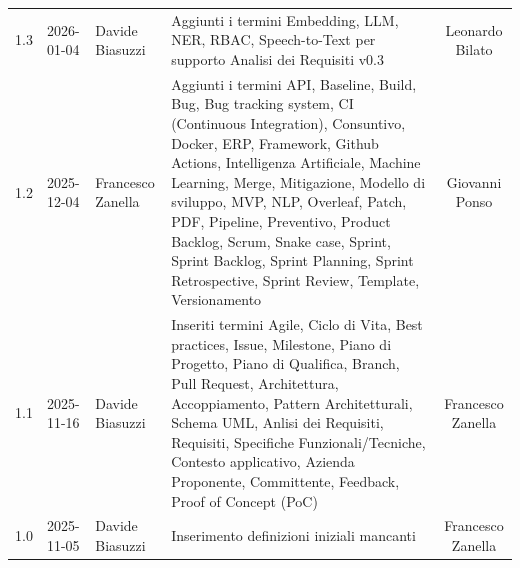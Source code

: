 \documentclass[a4paper, 11pt, oneside]{scrartcl} %
\begin{document}
\begin{center}
{\begin{tabular}{@{}llp{}p{}c@{}}
            1.3                                                                                                                                                            & 2026-01-04      & Davide Biasuzzi   & Aggiunti i termini Embedding, LLM, NER, RBAC, Speech-to-Text per supporto Analisi dei Requisiti v0.3                                                                                                                                                                                                                                                                                                                                     & Leonardo Bilato       \\
            1.2                                                                                                                                                            & 2025-12-04      & Francesco Zanella & Aggiunti i termini API, Baseline, Build, Bug, Bug tracking system, CI (Continuous Integration), Consuntivo, Docker, ERP, Framework, Github Actions, Intelligenza Artificiale, Machine Learning, Merge, Mitigazione, Modello di sviluppo, MVP, NLP, Overleaf, Patch, PDF, Pipeline, Preventivo, Product Backlog, Scrum, Snake case, Sprint, Sprint Backlog, Sprint Planning, Sprint Retrospective, Sprint Review, Template, Versionamento & Giovanni Ponso        \\
            1.1                                                                                                                                                            & 2025-11-16      & Davide Biasuzzi   & Inseriti termini Agile, Ciclo di Vita, Best practices, Issue, Milestone, Piano di Progetto, Piano di Qualifica, Branch, Pull Request, Architettura, Accoppiamento, Pattern Architetturali, Schema UML, Anlisi dei Requisiti, Requisiti, Specifiche Funzionali/Tecniche, Contesto applicativo, Azienda Proponente, Committente, Feedback, Proof of Concept (PoC)                                                                          & Francesco Zanella     \\
            1.0                                                                                                                                                            & 2025-11-05      & Davide Biasuzzi   & Inserimento definizioni iniziali mancanti                                                                                                                                                                                                                                                                                                                                                                                                & Francesco Zanella     \\

\end{tabular}}
\end{center}
\end{document}
